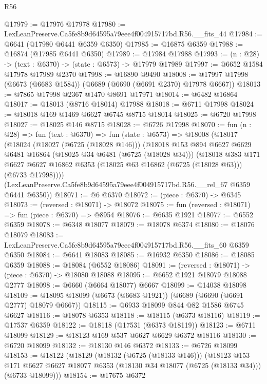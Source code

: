 \begin{lexlean}{R56}
\begin{coremodule}
@17979 := @17976 @17978
@17980 := LexLeanPreserve.Ca5fe8b9d64595a79eee4f004915717bd.R56.__fits_44
@17984 := @6641 (@17980 @6441 @6359 @6350)
@17985 := @16875 @6359
@17988 := @16874 (@17985 @6441 @6350)
@17989 := @17984 @17988
@17993 := (n : @28) -> (text : @6370) -> (state : @6573) -> @17979 @17989
@17997 := @6652 @1584 @17978 @17989 @2370
@17998 := @16890 @9490
@18008 := @17997 @17998 (@6673 (@6683 @1584)) (@6689 (@6690 (@6691 @2370) @17978 @6667))
@18013 := @7865 @17998 @2367 @1470 @8691 @17971
@18014 := @6482 @16864
@18017 := @18013 (@8716 @18014) @17988
@18018 := @6711 @17998
@18024 := @18018 @169 @1469 @6627 @6745 @8715 @18014
@18025 := @6720 @17998
@18027 := @18025 @146 @8715
@18028 := @6726 @17998
@18070 := fun (n : @28) =>
  fun (text : @6370) =>
  fun (state : @6573) =>
  @18008
    (@18017
      (@18024
        (@18027 (@6725 (@18028 @146)))
        (@18018
          @153
          @894
          @6627
          @6629
          @6481
          @16864
          (@18025 @34 @6481 (@6725 (@18028 @34)))
          (@18018
            @383
            @171
            @6627
            @6627
            @16862
            @6353
            (@18025 @63 @16862 (@6725 (@18028 @63)))
            (@6733 @17998))))
      (LexLeanPreserve.Ca5fe8b9d64595a79eee4f004915717bd.R56.__rel_67 @6359 @6441 @6350))
@18071 := @6 @6370
@18072 := (piece : @6370) -> @6345
@18073 := (reversed : @18071) -> @18072
@18075 := fun (reversed : @18071) => fun (piece : @6370) => @8954
@18076 := @6635 @1921
@18077 := @6552 @6359
@18078 := @6348 @18077
@18079 := @18078 @6374
@18080 := @18076 @18079
@18083 := LexLeanPreserve.Ca5fe8b9d64595a79eee4f004915717bd.R56.__fits_60 @6359 @6350
@18084 := @6641 @18083
@18085 := @16932 @6350
@18086 := @18085 @6359
@18088 := @18084 (@6552 @18086)
@18091 := (reversed : @18071) -> (piece : @6370) -> @18080 @18088
@18095 := @6652 @1921 @18079 @18088 @2777
@18098 := @6660 (@6664 @18077) @6667
@18099 := @14038 @18098
@18109 := @18095 @18099 (@6673 (@6683 @1921)) (@6689 (@6690 (@6691 @2777) @18079 @6667))
@18115 := @6933 @18099 @844 @82 @1586 @6745 @6627
@18116 := @18078 @6353
@18118 := @18115 (@6373 @18116)
@18119 := @17537 @6359
@18122 := @18118 (@17531 (@6373 @18119))
@18123 := @6711 @18099
@18129 := @18123 @169 @537 @6627 @6629 @6372 @18116
@18130 := @6720 @18099
@18132 := @18130 @146 @6372
@18133 := @6726 @18099
@18153 := @18122
    (@18129
      (@18132 (@6725 (@18133 @146)))
      (@18123
        @153
        @171
        @6627
        @6627
        @18077
        @6353
        (@18130 @34 @18077 (@6725 (@18133 @34)))
        (@6733 @18099)))
@18154 := @17675 @6372

\end{coremodule}
\end{lexlean}
